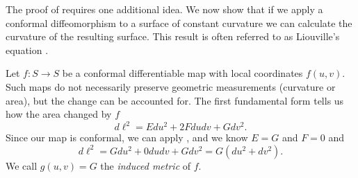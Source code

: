 The proof of  requires one additional idea. We now show that if we apply a conformal diffeomorphism
to a surface of constant curvature
we can calculate the curvature of the resulting surface.
This result is often referred to as Liouville's equation \cite{deigard-2020,dubrovin_modern_1984,liouville1838}.






Let $f:S\to S$ be a conformal differentiable map with local coordinates $f(u,v)$.
Such maps do not necessarily preserve geometric measurements (curvature or area), but the change
can be accounted for. 
The first fundamental form tells us how the area changed by $f$
$$d\ell^2=Edu^2+2Fdudv + Gdv^2.$$
Since our map is conformal, we can apply ,
and we know $E=G$ and $F=0$ and 
$$d\ell^2=Gdu^2+0dudv + Gdv^2=G(du^2+dv^2).$$
We call $g(u,v)=G$ the \emph{induced metric} of $f$.


